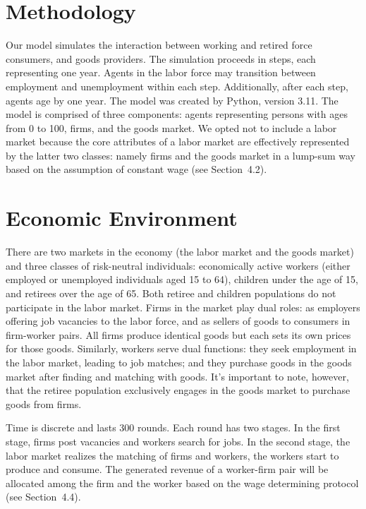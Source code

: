 \documentclass[ %
    final,
    scrbook,
    listoffigures,
    listoftables, 
    glossary]{cu-thesis}
\begin{document}
\section{Methodology}
Our model simulates the interaction between working and retired force consumers, and goods providers. The simulation proceeds in steps, each representing one year. Agents in the labor force may transition between employment and unemployment within each step. Additionally, after each step, agents age by one year. The model was created by Python, version 3.11. The model is comprised of three components: agents representing persons with ages from 0 to 100, firms, and the goods market. We opted not to include a labor market because the core attributes of a labor market are effectively represented by the latter two classes: namely firms and the goods market in a lump-sum way based on the assumption of constant wage (see Section~4.2).
  
\section{Economic Environment}
There are two markets in the economy (the labor market and the goods market) and three classes of risk-neutral individuals: economically active workers (either employed or unemployed individuals aged 15 to 64), children under the age of 15, and retirees over the age of 65. Both retiree and children populations do not participate in the labor market. Firms in the market play dual roles: as employers offering job vacancies to the labor force, and as sellers of goods to consumers in firm-worker pairs. All firms produce identical goods but each sets its own prices for those goods. Similarly, workers serve dual functions: they seek employment in the labor market, leading to job matches; and they purchase goods in the goods market after finding and matching with goods. It's important to note, however, that the retiree population exclusively engages in the goods market to purchase goods from firms. 

Time is discrete and lasts 300 rounds. Each round has two stages. In the first stage, firms post vacancies and workers search for jobs. In the second stage, the labor market realizes the matching of firms and workers, the workers start to produce and consume. The generated revenue of a worker-firm pair will be allocated among the firm and the worker based on the wage determining protocol (see Section~4.4).
\end{document}
